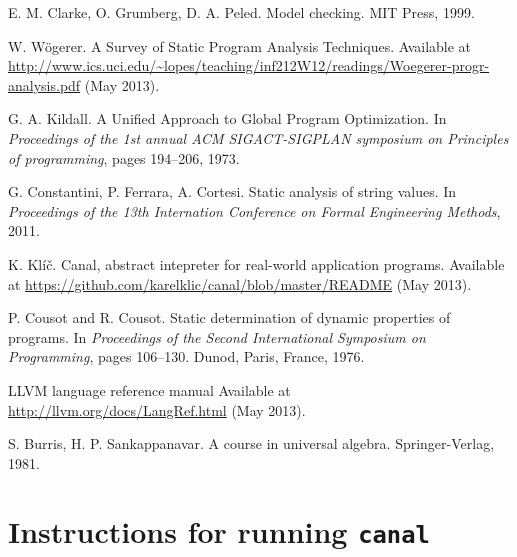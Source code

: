 \documentclass[12pt,final,oneside]{fithesis2}
\theoremstyle{definition}
\begin{document}
\begin{thebibliography}{99}
E{.} M{.} Clarke, O{.} Grumberg, D{.} A{.} Peled.
\newblock Model checking.
\newblock MIT Press, 1999.

W{.} W\"{o}gerer.
\newblock A Survey of Static Program Analysis Techniques.
\newblock Available at \url{http://www.ics.uci.edu/~lopes/teaching/inf212W12/readings/Woegerer-progr-analysis.pdf}
  (May 2013).

G{.} A{.} Kildall.
\newblock A Unified Approach to Global Program Optimization.
\newblock In \emph{Proceedings of the 1st annual ACM SIGACT-SIGPLAN
  symposium on Principles of programming}, pages 194--206, 1973.

G{.} Constantini, P{.} Ferrara, A{.} Cortesi.
\newblock Static analysis of string values.
\newblock In \emph{Proceedings of the 13th Internation Conference on Formal
  Engineering Methods}, 2011.

K{.} Klíč.
\newblock Canal, abstract intepreter for real-world application programs.
\newblock Available at \url{https://github.com/karelklic/canal/blob/master/README}
  (May 2013).

P{.} Cousot and R{.} Cousot.
\newblock Static determination of dynamic properties of programs.
\newblock In {\em Proceedings of the Second International Symposium on
  Programming}, pages 106--130. Dunod, Paris, France, 1976.

\newblock LLVM language reference manual
\newblock Available at \url{http://llvm.org/docs/LangRef.html} (May 2013).

S{.} Burris, H{.} P{.} Sankappanavar.
\newblock A course in universal algebra.
\newblock Springer-Verlag, 1981.

\end{thebibliography}


\appendix

\chapter{Instructions for running \texttt{canal}}
\label{chap:instructions}

\end{document}
